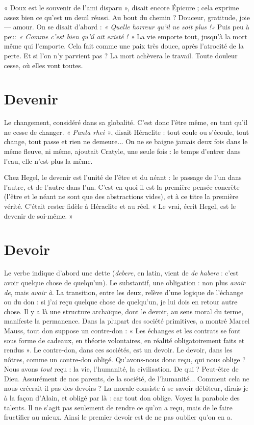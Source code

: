 « Doux est le souvenir de l’ami disparu », disait encore Épicure ; cela
exprime assez bien ce qu’est un deuil réussi. Au bout du chemin ? Douceur,
gratitude, joie — amour. On se disait d’abord : {\it « Quelle horreur qu'il ne soit
plus !»} Puis peu à peu: {\it « Comme c'est bien qu'il ait existé ! »} La vie emporte
tout, jusqu’à la mort même qui l’emporte. Cela fait comme une paix très
douce, après l’atrocité de la perte. Et si l’on n’y parvient pas ? La mort achèvera
le travail. Toute douleur cesse, où elles vont toutes.

\section{Devenir}
Le changement, considéré dans sa globalité. C’est donc l'être même,
en tant qu'il ne cesse de changer. {\it « Panta rhei »}, disait Héraclite :
tout coule ou s'écoule, tout change, tout passe et rien ne demeure... On ne se
baigne jamais deux fois dans le même fleuve, ni même, ajoutait Cratyle, une seule
fois : le temps d’entrer dans l’eau, elle n’est plus la même.

Chez Hegel, le devenir est l’unité de l’être et du néant : le passage de l’un
dans l’autre, et de l’autre dans l’un. C’est en quoi il est la première pensée
concrète (l'être et le néant ne sont que des abstractions vides), et à ce titre la
première vérité. C'était rester fidèle à Héraclite et au réel. « Le vrai, écrit Hegel,
est le devenir de soi-même. »

\section{Devoir}
Le verbe indique d’abord une dette ({\it debere}, en latin, vient de {\it de
habere} : c’est avoir quelque chose de quelqu’un). Le substantif, une
obligation : non plus {\it avoir de}, mais {\it avoir à}. La transition, entre les deux, relève
d’une logique de l'échange ou du don : si j’ai reçu quelque chose de quelqu'un,
je lui dois en retour autre chose. Il y a là une structure archaïque, dont le
devoir, au sens moral du terme, manifeste la permanence. Dans la plupart des
société primitives, a montré Marcel Mauss, tout don suppose un contre-don :
« Les échanges et les contrats se font sous forme de cadeaux, en théorie volontaires,
en réalité obligatoirement faits et rendus ». Le contre-don, dans ces
sociétés, est un devoir. Le devoir, dans les nôtres, comme un contre-don obligé.
Qu’avons-nous donc reçu, qui nous oblige ? Nous avons {\it tout} reçu : la vie,
l'humanité, la civilisation. De qui ? Peut-être de Dieu. Assurément de nos
parents, de la société, de l'humanité... Comment cela ne nous créerait-il pas
des devoirs ? La morale consiste à se savoir débiteur, dirais-je à la façon d’Alain,
et obligé par là : car tout don oblige. Voyez la parabole des talents. Il ne s’agit
pas seulement de rendre ce qu’on a reçu, mais de le faire fructifier au mieux.
Ainsi le premier devoir est de ne pas oublier qu’on en a.

